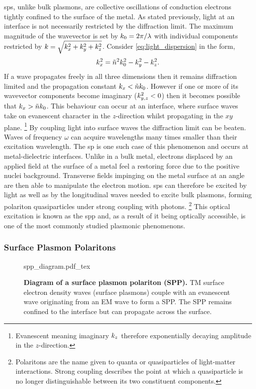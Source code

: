 \documentclass{article}
\begin{document}
\Glspl{sp}, unlike bulk plasmons, are collective oscillations of conduction electrons tightly confined to the surface of the metal. As stated previously, light at an interface is not necessarily restricted by the diffraction limit. The maximum magnitude of the wavevector is set by $k_0=2\pi/\lambda$ with individual components restricted by $k = \sqrt{k_x^2 + k_y^2 + k_z^2}$. Consider \eqref{eq:light_dispersion} in the form,
\begin{equation}
	k_x^2 = \tilde{n}^2 k_0^2 - k_y^2 - k_z^2.
\end{equation}
If a wave propagates freely in all three dimensions then it remains diffraction limited and the propagation constant $k_x < \tilde{n}k_0$. However if one or more of its wavevector components become imaginary ($k_{y,z}^2 < 0$) then it becomes possible that $k_x > \tilde{n}k_0$. This behaviour can occur at an interface, where surface waves take on evanescent character in the $z$-direction whilst propagating in the $xy$ plane.%
\footnote{Evanescent meaning imaginary $k_z$ therefore exponentially decaying amplitude in the $z$-direction.}
By coupling light into surface waves the diffraction limit can be beaten. Waves of frequency $\omega$ can acquire wavelengths many times smaller than their excitation wavelength. The \gls{sp} is one such case of this phenomenon and occurs at metal-dielectric interfaces. %
Unlike in a bulk metal, electrons displaced by an applied field at the surface of a metal feel a restoring force due to the positive nuclei background. Transverse fields impinging on the metal surface at an angle are then able to manipulate the electron motion. \Glspl{sp} can therefore be excited by light as well as by the longitudinal waves needed to excite bulk plasmons, forming polariton quasiparticles under strong coupling with photons.%
\footnote{Polaritons are the name given to quanta or quasiparticles of light-matter interactions. Strong coupling describes the point at which a quasiparticle is no longer distinguishable between its two constituent components.}
This optical excitation is known as the \gls{spp} and, as a result of it being optically accessible, is one of the most commonly studied plasmonic phenomenons.

\subsubsection{Surface Plasmon Polaritons}

\begin{figure}[bt]
\fontsize{10pt}{1em}\selectfont
\def\svgwidth{0.6\textwidth}
{spp_diagram.pdf_tex}
\caption[Diagram of a surface plasmon polariton (SPP)]{\textbf{Diagram of a surface plasmon polariton (SPP).} TM surface electron density waves (surface plasmons) couple with an evanescent wave originating from an EM wave to form a SPP. The SPP remains confined to the interface but can propagate across the surface.}
\label{fig:spp_diagram}
\end{figure}
\end{document}
